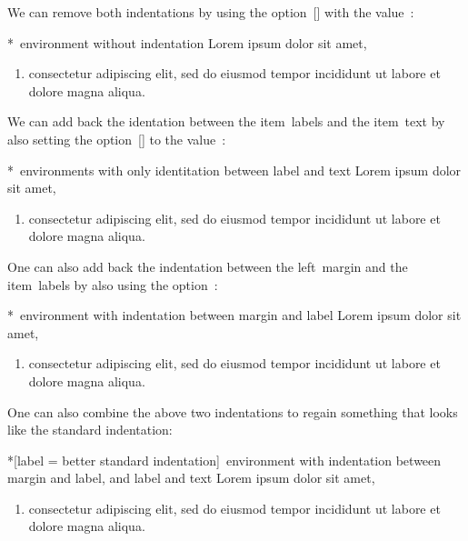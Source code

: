 We can remove both indentations by using the option~[\optname] with the value~\optname{0pt}:
\begin{showlatex}*{~environment without  indentation}
Lorem ipsum dolor sit amet,
\begin{enumerate}[wide = 0pt]
  \item
  consectetur adipiscing elit, sed do eiusmod tempor incididunt ut labore et dolore magna aliqua.
\end{enumerate}
\end{showlatex}
We can add back the identation between the item~labels and the item~text by also setting the option~[\optname] to the value~\optname{*}:
\begin{showlatex}*{~environments with only identitation between label and text}
Lorem ipsum dolor sit amet,
\begin{enumerate}[wide = 0pt, leftmargin = *]
  \item
  consectetur adipiscing elit, sed do eiusmod tempor incididunt ut labore et dolore magna aliqua.
\end{enumerate}
\end{showlatex}
One can also add back the indentation between the left~margin and the item~labels by also using the option~:
\begin{showlatex}*{~environment with indentation between margin and label}
Lorem ipsum dolor sit amet,
\begin{enumerate}[wide = 0pt, leftmargin = \parindent, labelindent = \parindent]
  \item
  consectetur adipiscing elit, sed do eiusmod tempor incididunt ut labore et dolore magna aliqua.
\end{enumerate}
\end{showlatex}
One can also combine the above two indentations to regain something that looks like the standard indentation:
\begin{showlatex}*[label = {better standard indentation}]{~environment with indentation between margin and label, and label and text}
Lorem ipsum dolor sit amet,
\begin{enumerate}[wide = 0pt, leftmargin = *, labelindent = \parindent]
  \item
  consectetur adipiscing elit, sed do eiusmod tempor incididunt ut labore et dolore magna aliqua.
\end{enumerate}
\end{showlatex}
